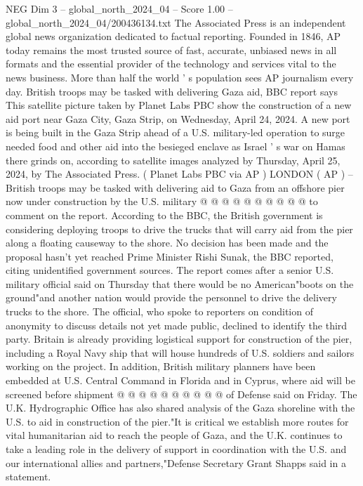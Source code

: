 \begin{textsample}{NEG Dim 3 – global\_north\_2024\_04 – Score 1.00 – global\_north\_2024\_04/200436134.txt}  \label{ex:f3_neg_401}
The Associated Press is an independent global news organization dedicated to factual reporting.
Founded in 1846, AP today remains the most trusted source of fast, accurate, unbiased news in all formats and the essential provider of the technology and services vital to the news business.
More than half the world ' s population sees AP journalism every day.
British troops may be tasked with delivering Gaza aid, BBC report says This satellite picture taken by Planet Labs PBC show the construction of a new aid port near Gaza City, Gaza Strip, on Wednesday, April 24, 2024.
A new port is being built in the Gaza Strip ahead of a U.S. military-led operation to surge needed food and other aid into the besieged enclave as Israel ' s war on Hamas there grinds on, according to satellite images analyzed by Thursday, April 25, 2024, by The Associated Press. ( Planet Labs PBC via AP ) LONDON ( AP ) -- British troops may be tasked with delivering aid to Gaza from an offshore pier now under construction by the U.S. military @ @ @ @ @ @ @ @ @ @ to comment on the report.
According to the BBC, the British government is considering deploying troops to drive the trucks that will carry aid from the pier along a floating causeway to the shore.
No decision has been made and the proposal hasn't yet reached Prime Minister Rishi Sunak, the BBC reported, citing unidentified government sources.
The report comes after a senior U.S. military official said on Thursday that there would be no American"boots on the ground"and another nation would provide the personnel to drive the delivery trucks to the shore.
The official, who spoke to reporters on condition of anonymity to discuss details not yet made public, declined to identify the third party.
Britain is already providing logistical support for construction of the pier, including a Royal Navy ship that will house hundreds of U.S. soldiers and sailors working on the project.
In addition, British military planners have been embedded at U.S.
Central Command in Florida and in Cyprus, where aid will be screened before shipment @ @ @ @ @ @ @ @ @ @ of Defense said on Friday.
The U.K.
Hydrographic Office has also shared analysis of the Gaza shoreline with the U.S. to aid in construction of the pier."It is critical we establish more routes for vital humanitarian aid to reach the people of Gaza, and the U.K. continues to take a leading role in the delivery of support in coordination with the U.S. and our international allies and partners,"Defense Secretary Grant Shapps said in a statement.

\end{textsample}
